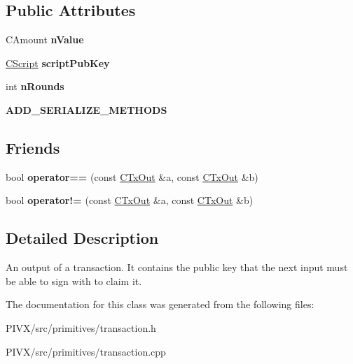 \subsection*{Public Attributes}
\begin{DoxyCompactItemize}
\item 
\mbox{\label{class_c_tx_out_ab278ecef3817a972cb6bc5360d13f197}} 
C\+Amount {\bfseries n\+Value}
\item 
\mbox{\label{class_c_tx_out_a25bf3f2f4befb22a6a0be45784fe57e2}} 
\mbox{\hyperlink{class_c_script}{C\+Script}} {\bfseries script\+Pub\+Key}
\item 
\mbox{\label{class_c_tx_out_aeac97244e392de9dad0c0d0dd0184d1e}} 
int {\bfseries n\+Rounds}
\item 
\mbox{\label{class_c_tx_out_add758078b21ec1004fe8144fcee44890}} 
{\bfseries A\+D\+D\+\_\+\+S\+E\+R\+I\+A\+L\+I\+Z\+E\+\_\+\+M\+E\+T\+H\+O\+DS}
\end{DoxyCompactItemize}
\subsection*{Friends}
\begin{DoxyCompactItemize}
\item 
\mbox{\label{class_c_tx_out_a7ae3396bfd80108be89eaa97573eb1bb}} 
bool {\bfseries operator==} (const \mbox{\hyperlink{class_c_tx_out}{C\+Tx\+Out}} \&a, const \mbox{\hyperlink{class_c_tx_out}{C\+Tx\+Out}} \&b)
\item 
\mbox{\label{class_c_tx_out_a9657dc95dd3ba8b612baf7a5dd9b2e02}} 
bool {\bfseries operator!=} (const \mbox{\hyperlink{class_c_tx_out}{C\+Tx\+Out}} \&a, const \mbox{\hyperlink{class_c_tx_out}{C\+Tx\+Out}} \&b)
\end{DoxyCompactItemize}


\subsection{Detailed Description}
An output of a transaction. It contains the public key that the next input must be able to sign with to claim it. 

The documentation for this class was generated from the following files\+:\begin{DoxyCompactItemize}
\item 
P\+I\+V\+X/src/primitives/transaction.\+h\item 
P\+I\+V\+X/src/primitives/transaction.\+cpp\end{DoxyCompactItemize}

